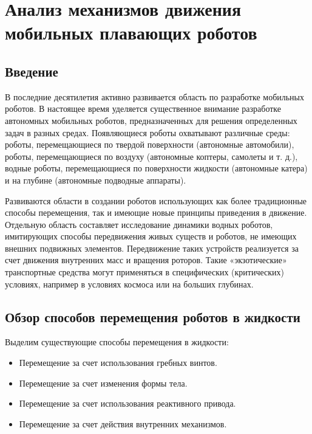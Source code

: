 \chapter{Анализ механизмов движения мобильных плавающих роботов}\label{ch:ch1}

\section{Введение}\label{sec:ch1/sec1}

В последние десятилетия активно развивается область по разработке мобильных роботов. В настоящее время уделяется существенное внимание разработке автономных мобильных роботов, предназначенных для решения определенных задач в разных средах. Появляющиеся роботы охватывают различные среды: роботы, перемещающиеся по твердой поверхности  (автономные автомобили), роботы, перемещающиеся по воздуху (автономные коптеры, самолеты и т. д.), водные роботы, перемещающиеся по поверхности жидкости (автономные катера) и на глубине (автономные подводные аппараты). 

Развиваются области в создании роботов использующих как более традиционные способы перемещения, так и имеющие новые принципы приведения в движение. Отдельную область составляет исследование динамики водных роботов, имитирующих способы передвижения живых существ и роботов, не имеющих внешних подвижных элементов. Передвижение таких устройств реализуется за счет движения внутренних масс и вращения роторов. Такие «экзотические» транспортные средства могут применяться в специфических (критических) условиях, например в условиях космоса или на больших глубинах.

\section{Обзор способов перемещения роботов в жидкости}\label{sec:ch1/sec21}

Выделим существующие способы перемещения в жидкости:

\begin{itemize}
	\item Перемещение за счет использования гребных винтов.
	\item Перемещение за счет изменения формы тела.
	\item Перемещение за счет использования реактивного привода.
	\item Перемещение за счет действия внутренних механизмов.
\end{itemize}

